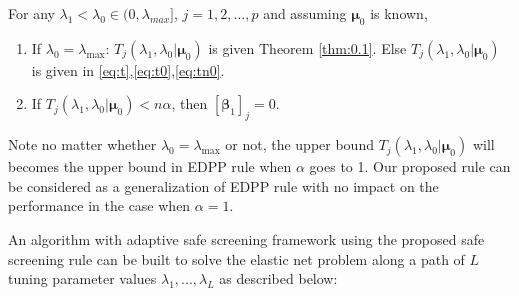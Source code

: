 \begin{theorem}
    \label{thm:rule}
    For any $\lambda_1<\lambda_{0}\in (0,\lambda_{max}]$, $j=1,2,...,p$ and assuming $\boldsymbol\mu_0$ is known,
    \begin{enumerate}
        \item If $\lambda_0=\lambda_{\max}$: $T_j(\lambda_1,\lambda_0|\boldsymbol\mu_0)$ is given Theorem \ref{thm:0.1}. Else $T_j(\lambda_1,\lambda_0|\boldsymbol\mu_0)$ is given in \eqref{eq:t},\eqref{eq:t0},\eqref{eq:tn0}.
        \item If $T_j(\lambda_1,\lambda_0|\boldsymbol\mu_0)<n\alpha$, then $[\boldsymbol\beta_{1}]_j=0$.
    \end{enumerate}
\end{theorem}
Note no matter whether $\lambda_0=\lambda_{\max}$ or not, the upper bound $T_j(\lambda_1,\lambda_0|\boldsymbol\mu_0)$ will becomes the upper bound in EDPP rule when $\alpha$ goes to 1. Our proposed rule can be considered as a generalization of EDPP rule with no impact on the performance in the case when $\alpha=1$.

An algorithm with adaptive safe screening framework \citep{wang2021adaptive} using the proposed safe screening rule can be built to solve the elastic net problem along a path of $L$ tuning parameter values $\lambda_1,...,\lambda_L$ as described below:

